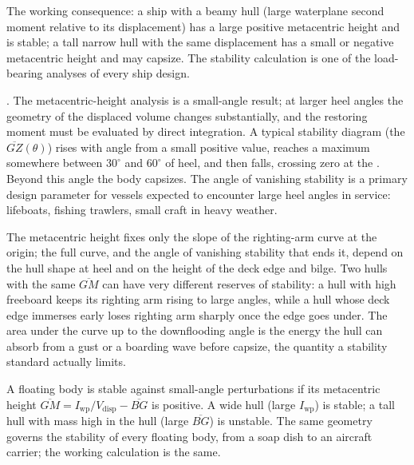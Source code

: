 The working consequence: a ship with a beamy hull (large
waterplane second moment relative to its displacement) has a
large positive metacentric height and is stable; a tall narrow
hull with the same displacement has a small or negative
metacentric height and may capsize. The stability calculation
is one of the load-bearing analyses of every ship design.

. The
metacentric-height analysis is a small-angle result; at larger
heel angles the geometry of the displaced volume changes
substantially, and the restoring moment must be evaluated by
direct integration. A typical stability diagram (the
 $\overline{GZ}(\theta)$) rises with
angle from a small positive value, reaches a maximum somewhere
between $30^{\circ}$ and $60^{\circ}$ of heel, and then falls,
crossing zero at the .
Beyond this angle the body capsizes. The angle of vanishing
stability is a primary design parameter for vessels expected to
encounter large heel angles in service: lifeboats, fishing
trawlers, small craft in heavy weather.



The metacentric height fixes only the slope of the righting-arm curve at
the origin; the full curve, and the angle of vanishing stability that
ends it, depend on the hull shape at heel and on the height of the
deck edge and bilge. Two hulls with the same $\overline{GM}$ can have
very different reserves of stability: a hull with high freeboard keeps
its righting arm rising to large angles, while a hull whose deck edge
immerses early loses righting arm sharply once the edge goes under. The
area under the curve up to the downflooding angle is the energy the hull
can absorb from a gust or a boarding wave before capsize, the quantity a
stability standard actually limits.

\begin{principle}
A floating body is stable against small-angle perturbations if
its metacentric height $\overline{GM} = I_{\text{wp}}/V_{\text{
disp}} - \overline{BG}$ is positive. A wide hull (large
$I_{\text{wp}}$) is stable; a tall hull with mass high in the
hull (large $\overline{BG}$) is unstable. The same geometry
governs the stability of every floating body, from a soap dish
to an aircraft carrier; the working calculation is the same.
\end{principle}

